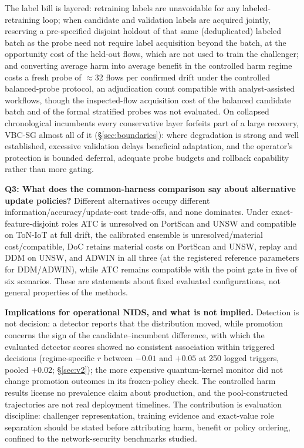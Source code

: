 \documentclass[a4paper,fleqn]{cas-sc}
\begin{document}
The label bill is layered: retraining labels are unavoidable for any labeled-retraining loop; when candidate and validation labels are acquired jointly, reserving a pre-specified disjoint holdout of that same (deduplicated) labeled batch as the probe need not require label acquisition beyond the batch, at the opportunity cost of the held-out flows, which are not used to train the challenger; and converting average harm into average benefit in the controlled harm regime costs a fresh probe of $\approx$32 flows per confirmed drift under the controlled balanced-probe protocol, an adjudication count compatible with analyst-assisted workflows, though the inspected-flow acquisition cost of the balanced candidate batch and of the formal stratified probes was not evaluated. On collapsed chronological incumbents every conservative layer forfeits part of a large recovery, VBC-SG almost all of it (\S\ref{sec:boundaries}): where degradation is strong and well established, excessive validation delays beneficial adaptation, and the operator's protection is bounded deferral, adequate probe budgets and rollback capability rather than more gating.

\textbf{Q3: What does the common-harness comparison say about alternative update policies?} Different alternatives occupy different information/accuracy/update-cost trade-offs, and none dominates. Under exact-feature-disjoint roles ATC is unresolved on PortScan and UNSW and compatible on ToN-IoT at full drift, the calibrated ensemble is unresolved/material cost/compatible, DoC retains material costs on PortScan and UNSW, replay and DDM on UNSW, and ADWIN in all three (at the registered reference parameters for DDM/ADWIN), while ATC remains compatible with the point gate in five of six scenarios. These are statements about fixed evaluated configurations, not general properties of the methods.

\textbf{Implications for operational NIDS, and what is not implied.} Detection is not decision: a detector reports that the distribution moved, while promotion concerns the sign of the candidate--incumbent difference, with which the evaluated detector scores showed no consistent association within triggered decisions (regime-specific $r$ between $-0.01$ and $+0.05$ at 250 logged triggers, pooled $+0.02$; \S\ref{sec:v2}); the more expensive quantum-kernel monitor did not change promotion outcomes in its frozen-policy check. The controlled harm results license no prevalence claim about production, and the pool-constructed trajectories are not real deployment timelines. The contribution is evaluation discipline: challenger representation, training evidence and exact-value role separation should be stated before attributing harm, benefit or policy ordering, confined to the network-security benchmarks studied.
\end{document}
